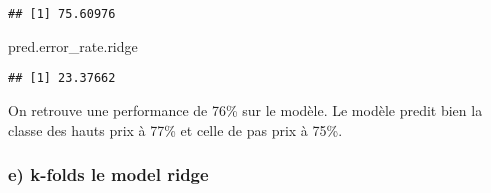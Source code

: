 \documentclass[
]{article}
\newenvironment{Shaded}{\begin{snugshade}}{\end{snugshade}}
\newcommand{\NormalTok}[1]{#1}
\begin{document}
\begin{verbatim}
## [1] 75.60976
\end{verbatim}

\begin{Shaded}
\begin{Highlighting}[]
\NormalTok{pred.error_rate.ridge}
\end{Highlighting}
\end{Shaded}

\begin{verbatim}
## [1] 23.37662
\end{verbatim}

On retrouve une performance de 76\% sur le modèle. Le modèle predit bien
la classe des hauts prix à 77\% et celle de pas prix à 75\%.

\hypertarget{e-k-folds-le-model-ridge}{%
\subsubsection{e) k-folds le model
ridge}\label{e-k-folds-le-model-ridge}}
\end{document}
